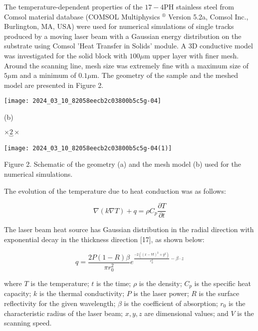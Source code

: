 \documentclass[10pt]{article}
\begin{document}
The temperature-dependent properties of the $17-4 \mathrm{PH}$ stainless steel from Comsol material database (COMSOL Multiphysics ${ }^{\circledR}$ Version 5.2a, Comsol Inc., Burlington, MA, USA) were used for numerical simulations of single tracks produced by a moving laser beam with a Gaussian energy distribution on the substrate using Comsol 'Heat Transfer in Solids' module. A 3D conductive model was investigated for the solid block with $100 \mu \mathrm{m}$ upper layer with finer mesh. Around the scanning line, mesh size was extremely fine with a maximum size of $5 \mu \mathrm{m}$ and a minimum of $0.1 \mu \mathrm{m}$. The geometry of the sample and the meshed model are presented in Figure 2.

\begin{center}
\texttt{[image: 2024\_03\_10\_82058eecb2c03800b5c5g-04]}
\end{center}

(b)

$\times \underbrace{2} \times$

\begin{center}
\texttt{[image: 2024\_03\_10\_82058eecb2c03800b5c5g-04(1)]}
\end{center}

Figure 2. Schematic of the geometry (a) and the mesh model (b) used for the numerical simulations.

The evolution of the temperature due to heat conduction was as follows:


\begin{equation*}
\nabla(k \nabla T)+q=\rho C_{p} \frac{\partial T}{\partial t} \tag{1}
\end{equation*}


The laser beam heat source has Gaussian distribution in the radial direction with exponential decay in the thickness direction [17], as shown below:


\begin{equation*}
q=\frac{2 P(1-R) \beta}{\pi r_{0}^{2}} e^{\frac{-2\left((x-V t)^{2}+y^{2}\right)}{r_{0}^{2}}-\beta \cdot z} \tag{2}
\end{equation*}


where $T$ is the temperature; $t$ is the time; $\rho$ is the density; $C_{p}$ is the specific heat capacity; $k$ is the thermal conductivity; $P$ is the laser power; $R$ is the surface reflectivity for the given wavelength; $\beta$ is the coefficient of absorption; $r_{0}$ is the characteristic radius of the laser beam; $x, y, z$ are dimensional values; and $V$ is the scanning speed.
\end{document}
